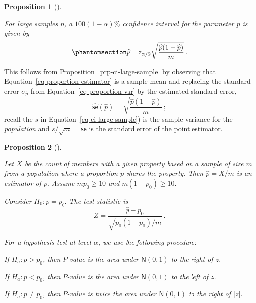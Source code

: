 \documentclass[
  a4paper,
  DIV=11,
  numbers=noendperiod,
  oneside]{scrreprt}
\theoremstyle{definition}
\theoremstyle{definition}
\theoremstyle{plain}
\newtheorem{proposition}{Proposition}[chapter]
\theoremstyle{plain}
\theoremstyle{definition}
\theoremstyle{remark}
\begin{document}
\begin{proposition}[]\protect\hypertarget{prp-ci-proportion}{}\label{prp-ci-proportion}

For large samples \(n\), a \(100(1-\alpha)\%\) confidence interval for
the parameter \(p\) is given by
\begin{equation}\phantomsection\label{eq-proportion-mean-ci}{
 \widehat{p} \pm z_{\alpha/2} \sqrt{\frac{\widehat{p} (1-\widehat{p})}{m}}\,.
}\end{equation}

\end{proposition}

This follows from Proposition~\ref{prp-ci-large-sample} by observing
that Equation~\ref{eq-proportion-estimator} is a sample mean and
replacing the standard error \(\sigma_{\widehat{p}}\) from
Equation~\ref{eq-proportion-var} by the estimated standard error, \[
 \widehat{\mathsf{se}}(\widehat{p}) = \sqrt{\frac{\widehat{p} (1-\widehat{p})}{m}}\,;
\] recall the \(s\) in Equation~\ref{eq-ci-large-sample}) is the sample
variance for the \emph{population} and \(s / \sqrt{m} = \mathsf{se}\) is
the standard error of the point estimator.

\begin{proposition}[]\protect\hypertarget{prp-htest-proportion}{}\label{prp-htest-proportion}

Let \(X\) be the count of members with a given property based on a
sample of size \(m\) from a population where a proportion \(p\) shares
the property. Then \(\widehat{p} = X / m\) is an estimator of \(p.\)
Assume \(m p_0 \geq 10\) and \(m (1-p_0) \geq 10.\)

Consider \(H_0 : p = p_0.\) The test statistic is \[
 Z = \frac{\widehat{p} - p_0}{\sqrt{p_0 (1-p_0) / m}} \,.
\]

For a hypothesis test at level \(\alpha\), we use the following
procedure:

If \(H_a : p > p_0\), then \(P\)-value is the area under
\(\mathsf{N}(0,1)\) to the right of \(z.\)

If \(H_a : p < p_0\), then \(P\)-value is the area under
\(\mathsf{N}(0,1)\) to the left of \(z.\)

If \(H_a : p \neq p_0\), then \(P\)-value is twice the area under
\(\mathsf{N}(0,1)\) to the right of \(|z|.\)

\end{proposition}
\end{document}
